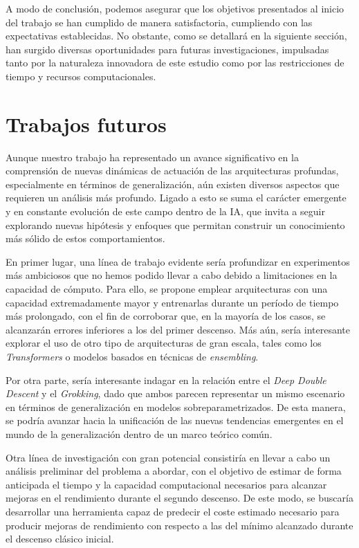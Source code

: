 A modo de conclusión, podemos asegurar que los objetivos presentados al inicio del trabajo se han cumplido de manera satisfactoria, cumpliendo con las expectativas establecidas. No obstante, como se detallará en la siguiente sección, han surgido diversas oportunidades para futuras investigaciones, impulsadas tanto por la naturaleza innovadora de este estudio como por las restricciones de tiempo y recursos computacionales.

\chapter{Trabajos futuros}\label{ch:trabajos-futuros}

Aunque nuestro trabajo ha representado un avance significativo en la comprensión de nuevas dinámicas de actuación de las arquitecturas profundas, especialmente en términos de generalización, aún existen diversos aspectos que requieren un análisis más profundo. Ligado a esto se suma el carácter emergente y en constante evolución de este campo dentro de la IA, que invita a seguir explorando nuevas hipótesis y enfoques que permitan construir un conocimiento más sólido de estos comportamientos.

En primer lugar, una línea de trabajo evidente sería profundizar en experimentos más ambiciosos que no hemos podido llevar a cabo debido a limitaciones en la capacidad de cómputo. Para ello, se propone emplear arquitecturas con una capacidad extremadamente mayor y entrenarlas durante un período de tiempo más prolongado, con el fin de corroborar que, en la mayoría de los casos, se alcanzarán errores inferiores a los del primer descenso. Más aún, sería interesante explorar el uso de otro tipo de arquitecturas de gran escala, tales como los \textit{Transformers} o modelos basados en técnicas de \textit{ensembling}.

Por otra parte, sería interesante indagar en la relación entre el \textit{Deep Double Descent} y el \textit{Grokking}, dado que ambos parecen representar un mismo escenario en términos de generalización en modelos sobreparametrizados. De esta manera, se podría avanzar hacia la unificación de las nuevas tendencias emergentes en el mundo de la generalización dentro de un marco teórico común.

Otra línea de investigación con gran potencial consistiría en llevar a cabo un análisis preliminar del problema a abordar, con el objetivo de estimar de forma anticipada el tiempo y la capacidad computacional necesarios para alcanzar mejoras en el rendimiento durante el segundo descenso. De este modo, se buscaría desarrollar una herramienta capaz de predecir el coste estimado necesario para producir mejoras de rendimiento con respecto a las del mínimo alcanzado durante el descenso clásico inicial. 

